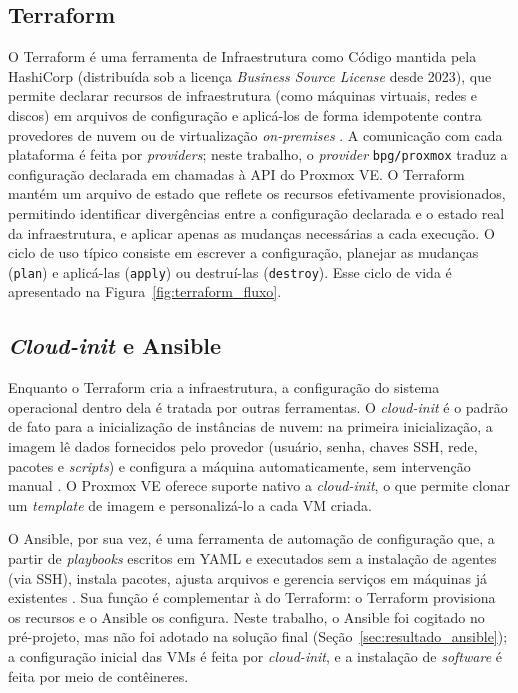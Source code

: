 \subsection{Terraform}
\label{sec:terraform}

O Terraform é uma ferramenta de Infraestrutura como Código mantida pela HashiCorp (distribuída sob a licença \textit{Business Source License} desde 2023), que permite declarar recursos de infraestrutura (como máquinas virtuais, redes e discos) em arquivos de configuração e aplicá-los de forma idempotente contra provedores de nuvem ou de virtualização \textit{on-premises} \cite{terraformDocs:online}. A comunicação com cada plataforma é feita por \textit{providers}; neste trabalho, o \textit{provider} \texttt{bpg/proxmox} traduz a configuração declarada em chamadas à API do Proxmox VE. O Terraform mantém um arquivo de estado que reflete os recursos efetivamente provisionados, permitindo identificar divergências entre a configuração declarada e o estado real da infraestrutura, e aplicar apenas as mudanças necessárias a cada execução. O ciclo de uso típico consiste em escrever a configuração, planejar as mudanças (\texttt{plan}) e aplicá-las (\texttt{apply}) ou destruí-las (\texttt{destroy}). Esse ciclo de vida é apresentado na Figura~\ref{fig:terraform_fluxo}.


\subsection{\textit{Cloud-init} e Ansible}
\label{sec:cloudinit_ansible}

\par Enquanto o Terraform cria a infraestrutura, a configuração do sistema operacional dentro dela é tratada por outras ferramentas. O \textit{cloud-init} é o padrão de fato para a inicialização de instâncias de nuvem: na primeira inicialização, a imagem lê dados fornecidos pelo provedor (usuário, senha, chaves SSH, rede, pacotes e \textit{scripts}) e configura a máquina automaticamente, sem intervenção manual \cite{cloudInitDocs:online}. O Proxmox VE oferece suporte nativo a \textit{cloud-init}, o que permite clonar um \textit{template} de imagem e personalizá-lo a cada VM criada.\\
\par O Ansible, por sua vez, é uma ferramenta de automação de configuração que, a partir de \textit{playbooks} escritos em YAML e executados sem a instalação de agentes (via SSH), instala pacotes, ajusta arquivos e gerencia serviços em máquinas já existentes \cite{ansibleDocs:online}. Sua função é complementar à do Terraform: o Terraform provisiona os recursos e o Ansible os configura. Neste trabalho, o Ansible foi cogitado no pré-projeto, mas não foi adotado na solução final (Seção~\ref{sec:resultado_ansible}); a configuração inicial das VMs é feita por \textit{cloud-init}, e a instalação de \textit{software} é feita por meio de contêineres.

